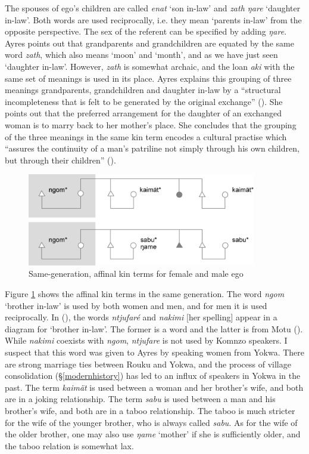 The spouses of ego's children are called \emph{enat} `son in-law' and \emph{zath ŋare} `daughter in-law'. Both words are used reciprocally, i.e. they mean `parents in-law' from the opposite perspective. The sex of the referent can be specified by adding \emph{ŋare}. Ayres points out that grandparents and grandchildren are equated by the same word \emph{zath}, which also means `moon' and `month', and as we have just seen `daughter in-law'. However, \emph{zath} is somewhat archaic, and the  loan \emph{aki} with the same set of meanings is used in its place. Ayres explains this grouping of three meanings \textendash{} grandparents, grandchildren and daughter in-law \textendash{} by a ``structural incompleteness that is felt to be generated by the original exchange'' (\citeyear[226]{Ayres:ws}). She points out that the preferred arrangement for the daughter of an exchanged woman is to marry back to her mother's place. She concludes that the grouping of the three meanings in the same kin term encodes a cultural practise which ``assures the continuity of a man's patriline not simply through his own children, but through their children'' (\citeyear[227]{Ayres:ws}).

\begin{figure}
	\includegraphics[width=10cm]{figures/kinship2.png}
	\caption[Same-generation, affinal kin terms for female and male ego]{Same-generation, affinal kin terms for female and male ego}
	\label{fig:kinship2}
\end{figure}%

Figure \ref{fig:kinship2} shows the affinal kin terms in the same generation. The word \emph{ngom} `brother in-law' is used by both women and men, and for men it is used reciprocally. In (\citealt[214]{Ayres:ws}), the words \emph{ntjufaré} and \emph{nakimi} [her spelling] appear in a  diagram for `brother in-law'. The former is a  word and the latter is from Motu (\citealt[107]{Turnerlister:1935motu}). While \emph{nakimi} coexists with \emph{ngom}, \emph{ntjufare} is not used by Komnzo speakers. I suspect that this word was given to Ayres by  speaking women from Yokwa. There are strong marriage ties between Rouku and Yokwa, and the process of village consolidation ({\S}\ref{modernhistory}) has led to an influx of  speakers in Yokwa in the past. The term \emph{kaimät} is used between a woman and her brother's wife, and both are in a joking relationship. The term \emph{sabu} is used between a man and his brother's wife, and both are in a taboo relationship. The taboo is much stricter for the wife of the younger brother, who is always called \emph{sabu}. As for the wife of the older brother, one may also use \emph{ŋame} `mother' if she is sufficiently older, and the taboo relation is somewhat lax.

